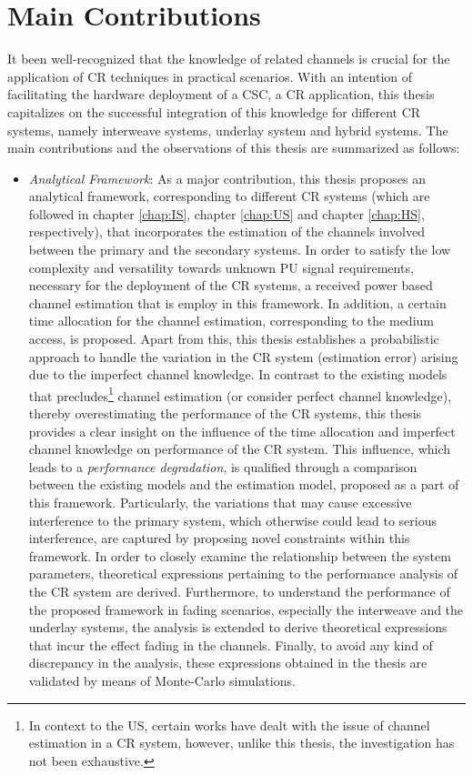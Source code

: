 \section{Main Contributions}
It been well-recognized that the knowledge of related channels is crucial for the application of CR techniques in practical scenarios. With an intention of facilitating the hardware deployment of a CSC, a CR application, this thesis capitalizes on the successful integration of this knowledge for different CR systems, namely interweave systems, underlay system and hybrid systems. The main contributions and the observations of this thesis are summarized as follows:
\begin{itemize}
\item \textit{Analytical Framework}: 
As a major contribution, this thesis proposes an analytical framework, corresponding to different CR systems (which are followed in chapter \ref{chap:IS}, chapter \ref{chap:US} and chapter \ref{chap:HS}, respectively), that incorporates the estimation of the channels involved between the primary and the secondary systems. In order to satisfy the low complexity and versatility towards unknown PU signal requirements, necessary for the deployment of the CR systems, a received power based channel estimation that is employ in this framework. In addition, a certain time allocation for the channel estimation, corresponding to the medium access, is proposed. Apart from this, this thesis establishes a probabilistic approach to handle the variation in the CR system (estimation error) arising due to the imperfect channel knowledge. In contrast to the existing models that precludes\footnote{In context to the US, certain works have dealt with the issue of channel estimation in a CR system, however, unlike this thesis, the investigation has not been exhaustive.} channel estimation (or consider perfect channel knowledge), thereby overestimating the performance of the CR systems, this thesis provides a clear insight on the influence of the time allocation and imperfect channel knowledge on performance of the CR system. This influence, which leads to a \textit{performance degradation}, is qualified through a comparison between the existing models and the estimation model, proposed as a part of this framework. Particularly, the variations that may cause excessive interference to the primary system, which otherwise could lead to serious interference, are captured by proposing novel constraints within this framework. In order to closely examine the relationship between the system parameters, theoretical expressions pertaining to the performance analysis of the CR system are derived. Furthermore, to understand the performance of the proposed framework in fading scenarios, especially the interweave and the underlay systems, the analysis is extended to derive theoretical expressions that incur the effect fading in the channels. Finally, to avoid any kind of discrepancy in the analysis, these expressions obtained in the thesis are validated by means of Monte-Carlo simulations. 

\end{itemize}
